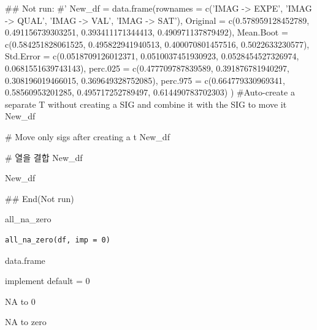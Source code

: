 \documentclass[a4paper]{book}
\begin{document}
%
\begin{Examples}
\begin{ExampleCode}

## Not run: 
#'
New_df = data.frame(rownames = c('IMAG -> EXPE', 'IMAG -> QUAL', 'IMAG -> VAL', 'IMAG -> SAT'),
  Original = c(0.578959128452789, 0.491156739303251, 0.393411171344413, 0.490971137879492),
 Mean.Boot = c(0.584251828061525, 0.495822941940513, 0.400070801457516, 0.5022633230577),
 Std.Error = c(0.0518709126012371, 0.0510037451930923, 0.0528454527326974, 0.0681551639743143),
 perc.025 = c(0.477709787839589, 0.391876781940297, 0.308196019466015, 0.369649328752085),
  perc.975 = c(0.664779330969341, 0.58560953201285, 0.495717252789497, 0.614490783702303)
)
#Auto-create a separate T without creating a SIG and combine it with the SIG to move it
New_df %


# Move only sigs after creating a t
New_df %

# 열을 결합
New_df %

New_df %


## End(Not run)
\end{ExampleCode}
\end{Examples}
%
\begin{Description}
all\_na\_zero
\end{Description}
%
\begin{Usage}
\begin{verbatim}
all_na_zero(df, imp = 0)
\end{verbatim}
\end{Usage}
%
\begin{Arguments}
\begin{ldescription}
\item[\code{df}] data.frame

\item[\code{imp}] implement default = 0
\end{ldescription}
\end{Arguments}
%
\begin{Value}
NA to 0
\end{Value}
%
\begin{Description}
NA to zero
\end{Description}
\end{document}
